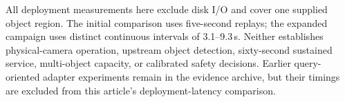 All deployment measurements here exclude disk I/O and cover one supplied object region. The initial comparison uses five-second replays; the expanded campaign uses distinct continuous intervals of 3.1--9.3\,s. Neither establishes physical-camera operation, upstream object detection, sixty-second sustained service, multi-object capacity, or calibrated safety decisions. Earlier query-oriented adapter experiments remain in the evidence archive, but their timings are excluded from this article's deployment-latency comparison.
\FloatBarrier
